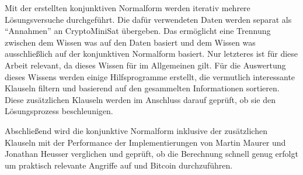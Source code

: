 Mit der erstellten konjunktiven Normalform werden iterativ mehrere Lösungsversuche durchgeführt. Die dafür verwendeten
Daten werden separat als "`Annahmen"' an CryptoMiniSat übergeben. Das ermöglicht eine Trennung zwischen dem Wissen was
auf den Daten basiert und dem Wissen was ausschließlich auf der konjunktiven Normalform basiert. Nur letzteres ist für
diese Arbeit relevant, da dieses Wissen für  im Allgemeinen gilt. Für die Auswertung dieses Wissens werden einige
Hilfsprogramme erstellt, die vermutlich interessante Klauseln filtern und basierend auf den gesammelten Informationen
sortieren. Diese zusätzlichen Klauseln werden im Anschluss darauf geprüft, ob sie den Lösungsprozess beschleunigen.

Abschließend wird die konjunktive Normalform inklusive der zusätzlichen Klauseln mit der Performance der Implementierungen
von Martin Maurer und Jonathan Heusser verglichen und geprüft, ob die Berechnung schnell genug erfolgt um praktisch relevante
Angriffe auf  und Bitcoin durchzuführen.